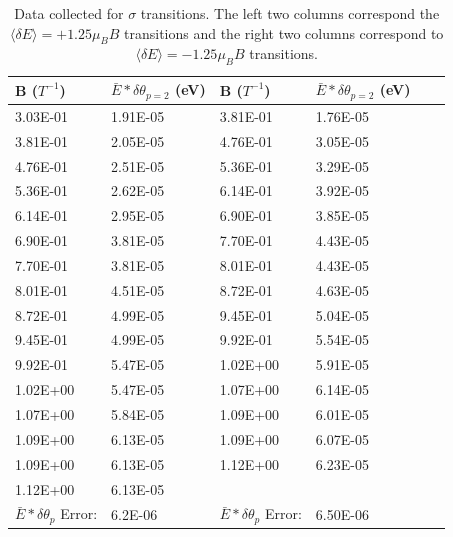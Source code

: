 \documentclass[12pt]{article}
\begin{document}
\begin{table}[h!]\centering
\begin{tabular}{ |p{2.5cm}|p{2.5cm}||p{2.5cm}|p{2.5cm}|p{2.5cm}|p{2.5cm}|}
 \hline
  B ($T^{-1}$)& $\bar{E} * \delta\theta_{p=2}$ (eV)& B ($T^{-1}$) & $\bar{E} * \delta\theta_{p=2}$ (eV)\\
 \hline
3.03E-01&	1.91E-05&	3.81E-01&	1.76E-05 \\
3.81E-01&	2.05E-05&	4.76E-01&	3.05E-05\\
4.76E-01&	2.51E-05&	5.36E-01&	3.29E-05\\
5.36E-01&	2.62E-05&	6.14E-01&	3.92E-05\\
6.14E-01&	2.95E-05&	6.90E-01&	3.85E-05\\
6.90E-01&	3.81E-05&	7.70E-01&	4.43E-05\\
7.70E-01&	3.81E-05&	8.01E-01&	4.43E-05\\
8.01E-01&	4.51E-05&	8.72E-01&	4.63E-05\\
8.72E-01&	4.99E-05&	9.45E-01&	5.04E-05\\
9.45E-01&	4.99E-05&	9.92E-01&	5.54E-05\\
9.92E-01&	5.47E-05&	1.02E+00&	5.91E-05\\
1.02E+00&	5.47E-05&	1.07E+00&	6.14E-05\\
1.07E+00&	5.84E-05&	1.09E+00&	6.01E-05\\
1.09E+00&	6.13E-05&	1.09E+00&	6.07E-05\\
1.09E+00&	6.13E-05&	1.12E+00&	6.23E-05\\
1.12E+00&	6.13E-05&		&\\
\hline
$\bar{E} * \delta\theta_p$ Error: & 6.2E-06 & $\bar{E} * \delta\theta_p$ Error:  & 6.50E-06\\
\hline
\end{tabular}
\def\sym#1{\ifmmode^{#1}\else\(^{#1}\)\fi}
\caption{Data collected for $\sigma$ transitions. The left two columns correspond the $\langle\delta E\rangle = +1.25 \mu_BB$ transitions and the right two columns correspond to $\langle\delta E\rangle = -1.25 \mu_BB$ transitions.}
\label{tab:sigmatrans}
\end{table}
\end{document}
